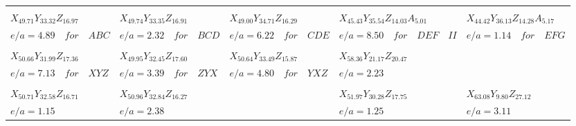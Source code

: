 \documentclass[16pt]{scrartcl}
\begin{document}
{\footnotesize
\begin{tabular}[t]{|p{4.7cm}||p{4.7cm}||p{4.7cm}||p{4.7cm}||p{4.7cm}|}
\hline
 & & & & \\
$X_{49.71} Y_{33.32} Z_{16.97}$ &
$X_{49.74} Y_{33.35} Z_{16.91}$ &
$X_{49.00} Y_{34.71} Z_{16.29}$ &
$X_{45.43} Y_{35.54} Z_{14.03} A_{5.01}$ &
$X_{44.42} Y_{36.13} Z_{14.28} A_{5.17}$ \\
$e/a = 4.89 \quad for \quad ABC$ &
$e/a = 2.32 \quad for \quad BCD $ &
$e/a = 6.22 \quad for \quad CDE $ &
$e/a = 8.50 \quad for \quad DEF \quad II $ &
$e/a = 1.14 \quad for \quad EFG$ \\
\hline
 & & & & \\
$X_{50.66} Y_{31.99} Z_{17.36}$ &
$X_{49.95} Y_{32.45} Z_{17.60}$ &
$X_{50.64} Y_{33.49} Z_{15.87}$ &
$X_{58.36} Y_{21.17} Z_{20.47}$ &
$ $ \\
$e/a = 7.13 \quad for \quad XYZ$ &
$e/a = 3.39 \quad for \quad ZYX $ &
$e/a = 4.80 \quad for \quad YXZ $ &
$e/a = 2.23 $ &
$ $ \\
\hline
 & & & & \\
$X_{50.71} Y_{32.58} Z_{16.71}$ &
$X_{50.96} Y_{32.84} Z_{16.27}$ &
$ $ &
$X_{51.97} Y_{30.28} Z_{17.75}$ &
$X_{63.08} Y_{9.80} Z_{27.12}$ \\
$e/a = 1.15 $ &
$e/a = 2.38 $ &
$ $ &
$e/a = 1.25 $ &
$e/a = 3.11 $ \\
\hline
\end{tabular} }
\end{document}

